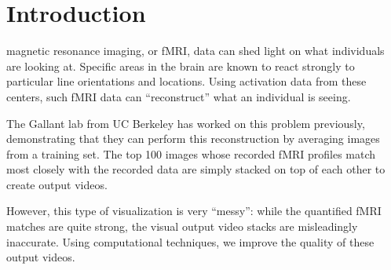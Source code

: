 
\section{Introduction}
 magnetic resonance imaging, or fMRI, data can shed light on what individuals are looking at.  Specific areas in the brain are known to react strongly to particular line orientations and locations.  Using activation data from these centers, such fMRI data can ``reconstruct'' what an individual is seeing.

The Gallant lab from UC Berkeley has worked on this problem previously, demonstrating  that they can perform this reconstruction by averaging images from a training set.  The top 100 images whose recorded fMRI profiles match most closely with the recorded data are simply stacked on top of each other to create output videos.

However, this type of visualization is very ``messy'': while the quantified fMRI matches are quite strong, the visual output video stacks are misleadingly inaccurate.  Using computational techniques, we improve the quality of these output videos.